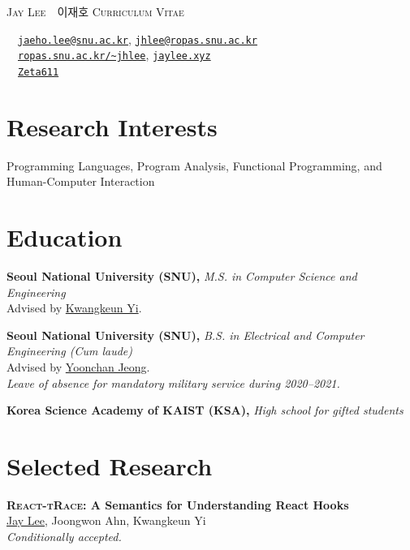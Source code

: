 \documentclass[a4paper,10pt,oneside]{memoir}
\newcommand*\mail[1]{\href{mailto:#1}{\texttt{#1}}}
\newcommand*\github[1]{\href{https://github.com/#1}{\texttt{#1}}}
\begin{document}
{\huge \textsc{Jay Lee}~~이재호 \hfill \textsc{Curriculum Vitae}}

\vspace{0.5\onelineskip}
\faEnvelope[regular]~~\mail{jaeho.lee@snu.ac.kr}, \mail{jhlee@ropas.snu.ac.kr} \\
\faGlobe~~\href{https://ropas.snu.ac.kr/~jhlee/}{\texttt{ropas.snu.ac.kr/\textasciitilde jhlee}}, \href{https://jaylee.xyz/}{\texttt{jaylee.xyz}} \\
\faGithub~~\github{Zeta611}

\section{Research Interests}
Programming Languages, Program Analysis, Functional Programming, and Human-Computer Interaction

\section{Education}
\textbf{\textsf{Seoul National University (SNU),}} \textit{M.S. in Computer Science and Engineering}\\
Advised by \href{http://kwangkeunyi.snu.ac.kr/}{Kwangkeun Yi}.
\vspace{0.5\onelineskip}

\textbf{\textsf{Seoul National University (SNU),}} \textit{B.S. in Electrical and Computer Engineering (Cum laude)}\\
Advised by \href{https://laser.snu.ac.kr/members/professor}{Yoonchan Jeong}.\\
\textit{Leave of absence for mandatory military service during 2020--2021.}
\vspace{0.5\onelineskip}

\textbf{\textsf{Korea Science Academy of KAIST (KSA),}} \textit{High school for gifted students}


\section{Selected Research}
\textbf{\textsf{\textsc{React-tRace:} A Semantics for Understanding React Hooks}}\\
\ul{Jay Lee}, Joongwon Ahn, Kwangkeun Yi\\
\textit{Conditionally accepted.}
\vspace{0.5\onelineskip}
\end{document}
